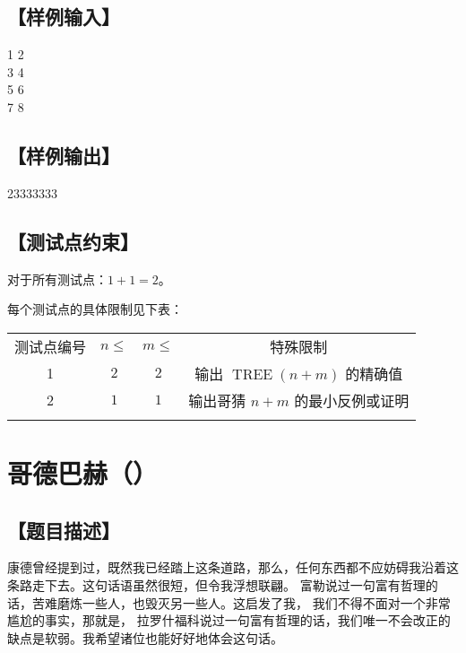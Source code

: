 \documentclass{statement}
\begin{document}
    \subsection[样例输入]{【样例输入】}
    \begin{example}
1 2\\
3 4\\
5 6\\
7 8
    \end{example}

    \subsection[样例输出]{【样例输出】}
    \begin{example}
23333333
    \end{example}

    \subsection[测试点约束]{【测试点约束】}
    对于所有测试点：$1+1=2$。

    每个测试点的具体限制见下表：
    \begin{center}
        \begin{tabular}{c|c|c|c}
            \Xhline{5\arrayrulewidth}
            测试点编号 & $n\leq$ & $m\leq$ & 特殊限制\\
            \Xhline{3\arrayrulewidth}
            1 & $2$ & $2$ & 输出 $\operatorname{TREE}(n+m)$ 的精确值\\
            \hline
            2 & $1$ & $1$ & 输出哥猜 $n+m$ 的最小反例或证明\\
            \Xhline{5\arrayrulewidth}
        \end{tabular}
    \end{center}



    \newpage
    
    \section{哥德巴赫（）}
    \subsection[题目描述]{【题目描述】}

    康德曾经提到过，既然我已经踏上这条道路，那么，任何东西都不应妨碍我沿着这条路走下去。这句话语虽然很短，但令我浮想联翩。 富勒说过一句富有哲理的话，苦难磨炼一些人，也毁灭另一些人。这启发了我， 我们不得不面对一个非常尴尬的事实，那就是， 拉罗什福科说过一句富有哲理的话，我们唯一不会改正的缺点是软弱。我希望诸位也能好好地体会这句话。 
    
\end{document}

